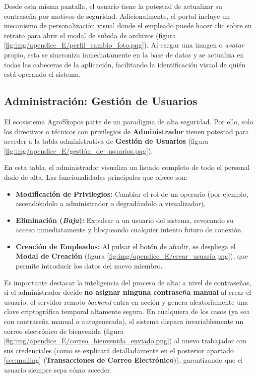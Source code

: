 Desde esta misma pantalla, el usuario tiene la potestad de actualizar su contraseña por motivos de seguridad. Adicionalmente, el portal incluye un mecanismo de personalización visual donde el empleado puede hacer clic sobre su retrato para abrir el modal de subida de archivos (figura \ref{fig:img/apendice_E/perfil_cambio_foto.png}). Al cargar una imagen o \textit{avatar} propio, esta se sincroniza inmediatamente en la base de datos y se actualiza en todas las cabeceras de la aplicación, facilitando la identificación visual de quién está operando el sistema.


\subsection{Administración: Gestión de Usuarios}
El ecosistema AgroSkopos parte de un paradigma de alta seguridad. Por ello, solo los directivos o técnicos con privilegios de \textbf{Administrador} tienen potestad para acceder a la tabla administrativa de \textbf{Gestión de Usuarios} (figura \ref{fig:img/apendice_E/gestión_de_usuarios.png}). 


En esta tabla, el administrador visualiza un listado completo de todo el personal dado de alta. Las funcionalidades principales que ofrece son:
\begin{itemize}
    \item \textbf{Modificación de Privilegios:} Cambiar el rol de un operario (por ejemplo, ascendiéndolo a administrador o degradándolo a visualizador).
    \item \textbf{Eliminación (\textit{Baja}):} Expulsar a un usuario del sistema, revocando su acceso inmediatamente y bloqueando cualquier intento futuro de conexión.
    \item \textbf{Creación de Empleados:} Al pulsar el botón de añadir, se despliega el \textbf{Modal de Creación} (figura \ref{fig:img/apendice_E/crear_usuario.png}), que permite introducir los datos del nuevo miembro.
\end{itemize}


Es importante destacar la inteligencia del proceso de alta: a nivel de contraseñas, si el administrador decide \textbf{no asignar ninguna contraseña manual} al crear el usuario, el servidor remoto \textit{backend} entra en acción y genera aleatoriamente una clave criptográfica temporal altamente segura. En cualquiera de los casos (ya sea con contraseña manual o autogenerada), el sistema dispara invariablemente un correo electrónico de bienvenida (figura \ref{fig:img/apendice_E/correo_bienvenida_enviado.png}) al nuevo trabajador con sus credenciales (como se explicará detalladamente en el posterior apartado \ref{sec:mailing} (\textbf{Transacciones de Correo Electrónico})), garantizando que el usuario siempre sepa cómo acceder.

